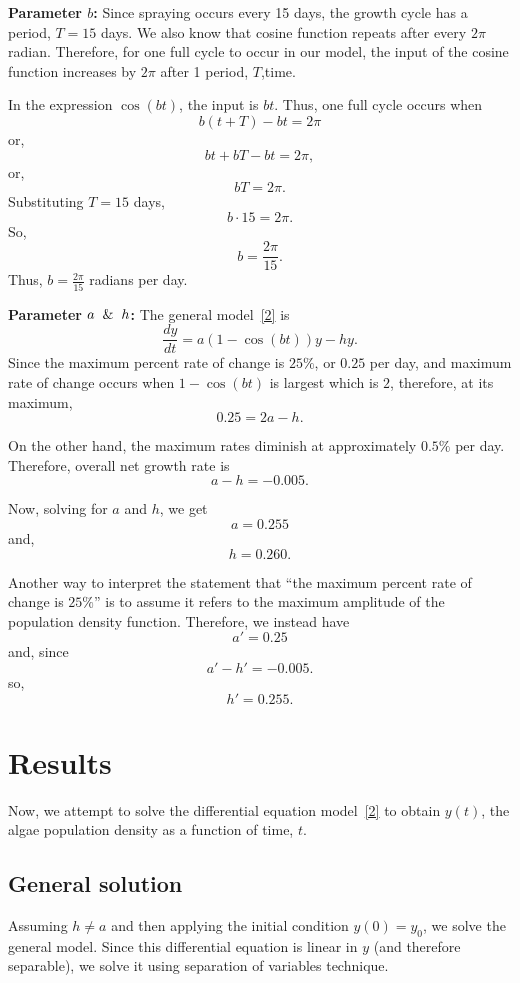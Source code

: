 \documentclass[11pt]{article}
\begin{document}
\textbf{Parameter $b$:} Since spraying occurs every 15 days, the growth cycle has a period, $T = 15$ days. We also know that cosine function repeats after every $2\pi$ radian. Therefore, for one full cycle to occur in our model, the input of the cosine function increases by $2\pi$ after 1 period, $T$,time.

In the expression $\cos(bt)$, the input is $bt$. Thus, one full cycle occurs when
\[
b(t+T) - bt = 2\pi
\]
or,
\[
bt + bT - bt = 2\pi,
\]
or,
\[
bT = 2\pi.
\]
Substituting $T = 15$ days,
\[
b\cdot15 = 2\pi.
\]
So,
\[
b = \frac{2\pi}{15}.
\]
Thus, $b = \frac{2\pi}{15}$ radians per day.

\textbf{Parameter $a \And h$:} The general model~\ref{2} is
\begin{equation}
    \frac{dy}{dt} = a(1 - \cos(bt))y - hy.
\end{equation}
Since the maximum percent rate of change is $25\%$, or $0.25$ per day, and maximum rate of change occurs when $1 - \cos(bt)$ is largest which is $2$, therefore, at its maximum, 
\[
0.25 = 2a - h.
\]

On the other hand, the maximum rates diminish at approximately $0.5\%$ per day. Therefore, overall net growth rate is
\[
a - h = -0.005.
\]

Now, solving for $a$ and $h$, we get
\[
a = 0.255
\]
and,
\[
h = 0.260.
\]

Another way to interpret the statement that ``the maximum percent rate of change is $25\%$'' is to assume it refers to the maximum amplitude of the population density function. Therefore, we instead have
\[
a' = 0.25
\]
and, since
\[
a' - h' = -0.005.
\]
so,
\[
h' = 0.255.
\]

\section{Results}

Now, we attempt to solve the differential equation model~\ref{2} to obtain $y(t)$, the algae population density as a function of time, $t$.

\subsection{General solution}

Assuming $h \ne a$ and then applying the initial condition $y(0)=y_0$, we solve the general model. Since this differential equation is linear in $y$ (and therefore separable), we solve it using separation of variables technique.
\end{document}

